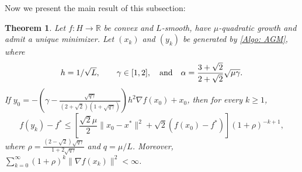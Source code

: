 \documentclass[pdflatex,sn-mathphys-num]{sn-jnl}
\theoremstyle{thmstyleone}
\newtheorem{theorem}{Theorem}
\theoremstyle{thmstyletwo}
\theoremstyle{thmstylethree}
\newcommand{\qbox}[1]{\quad\hbox{#1}\quad}
\newcommand{\R}{\mathbb{R}}
\begin{document}
Now we present the main result of this subsection:

\begin{theorem}\label{Thm: algo_QG_OGM}
Let $f:H\to\R$ be convex and $L$-smooth, have $\mu$-quadratic growth and admit a unique minimizer. Let $(x_k)$ and $(y_k)$ be generated by \eqref{Algo: AGM}, where
$$ h=1/\sqrt{L},\qbox{} \gamma\in[1,2],\qbox{and}\alpha=\frac{3+\sqrt{2}}{2+\sqrt{2}}\sqrt{\mu\gamma}. $$
If $y_0 = -\left( \gamma - \frac{\sqrt{q\gamma}}{ (2+\sqrt{2})(1+\sqrt{q\gamma}) } \right)h^2\nabla f(x_0) + x_0$, then for every $k\ge 1$,
$$ f(y_k) - f^* \le \left[ \frac{\sqrt{2}\mu}{2} \| x_0 - x^* \|^2 + \sqrt{2}\left( f(x_0) - f^* \right)  \right] (1+\rho)^{-k+1}, $$
where $\rho = \frac{ (2-\sqrt{2})\sqrt{q\gamma} }{ 1 + 2\sqrt{q\gamma} }$ and $q=\mu/L$. Moreover, $\sum_{k=0}^\infty (1+\rho)^k \| \nabla f(x_k) \|^2 < \infty$.
\end{theorem}
\end{document}

